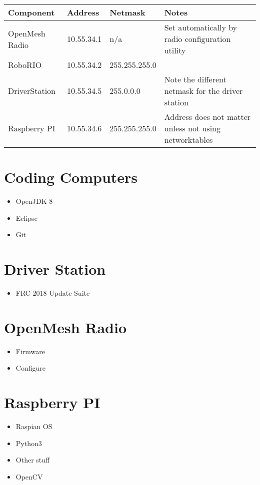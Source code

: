 	{\renewcommand{\arraystretch}{1.5}
	\begin{tabular}{ @{} l l l p{3in} }
	\textbf{Component} & \textbf{Address} & \textbf{Netmask} & \textbf{Notes} \\
	\midrule
	OpenMesh Radio & 10.55.34.1 & n/a & Set automatically by radio configuration utility \\
	RoboRIO        & 10.55.34.2 & 255.255.255.0 \\
	DriverStation  & 10.55.34.5 & 255.0.0.0     & Note the different netmask for the driver station \\
	Raspberry PI   & 10.55.34.6 & 255.255.255.0 & Address does not matter unless not using networktables \\
	\end{tabular}
	}




\newpage\section*{Coding Computers}

\begin{itemize}
\item OpenJDK 8
\item Eclipse
\item Git
\end{itemize}


\section*{Driver Station}
\begin{itemize}
\item FRC 2018 Update Suite
\end{itemize}


\section*{OpenMesh Radio}
\begin{itemize}
\item Firmware
\item Configure
\end{itemize}


\section*{Raspberry PI}
\begin{itemize}
\item Raspian OS
\item Python3
\item Other stuff
\item OpenCV
\end{itemize}


